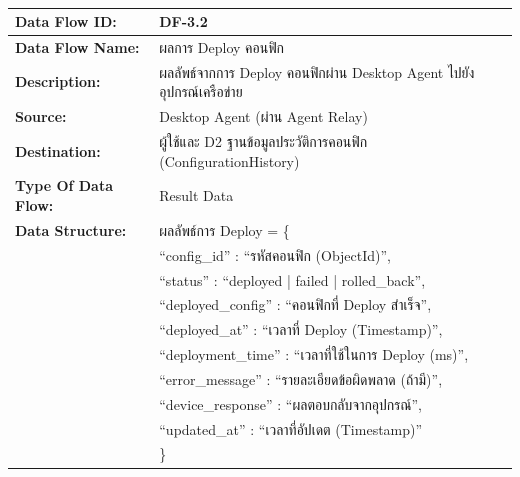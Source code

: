 \begin{table}[H]
    \caption{}
    \label{tab:df-3-2}
    \fontSixTeen 
    \begin{tabularx}{\textwidth}{|l|L|} 
        \hline
        \textbf{Data Flow ID:} & DF-3.2 \\
        \hline
        \textbf{Data Flow Name:} & ผลการ Deploy คอนฟิก \\
        \hline
        \textbf{Description:} & ผลลัพธ์จากการ Deploy คอนฟิกผ่าน Desktop Agent ไปยังอุปกรณ์เครือข่าย \\
        \hline
        \textbf{Source:} & Desktop Agent (ผ่าน Agent Relay) \\
        \hline
        \textbf{Destination:} & ผู้ใช้และ D2 ฐานข้อมูลประวัติการคอนฟิก (ConfigurationHistory) \\
        \hline
        \textbf{Type Of Data Flow:} & Result Data \\
        \hline
        \textbf{Data Structure:} & ผลลัพธ์การ Deploy = \{ \nonumber \\
                        & \hspace{1em} ``config\_id'' : ``รหัสคอนฟิก (ObjectId)'', \nonumber \\
                        & \hspace{1em} ``status'' : ``deployed | failed | rolled\_back'', \nonumber \\
                        & \hspace{1em} ``deployed\_config'' : ``คอนฟิกที่ Deploy สำเร็จ'', \nonumber \\
                        & \hspace{1em} ``deployed\_at'' : ``เวลาที่ Deploy (Timestamp)'', \nonumber \\
                        & \hspace{1em} ``deployment\_time'' : ``เวลาที่ใช้ในการ Deploy (ms)'', \nonumber \\
                        & \hspace{1em} ``error\_message'' : ``รายละเอียดข้อผิดพลาด (ถ้ามี)'', \nonumber \\
                        & \hspace{1em} ``device\_response'' : ``ผลตอบกลับจากอุปกรณ์'', \nonumber \\
                        & \hspace{1em} ``updated\_at'' : ``เวลาที่อัปเดต (Timestamp)'' \nonumber \\
                        & \} \\
        \hline
    \end{tabularx}
\end{table}

